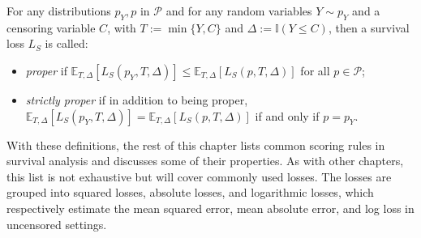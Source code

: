 \documentclass[
  letterpaper,
  krantz2]{style/krantz}
\providecommand{\tightlist}{%
  \setlength{\itemsep}{0pt}\setlength{\parskip}{0pt}}
\begin{document}
For any distributions \(p_Y, p\) in \(\mathcal{P}\) and for any random
variables \(Y \sim p_Y\) and a censoring variable \(C\), with
\(T := \min\{Y,C\}\) and \(\Delta := \mathbb{I}(Y \le C)\), then a
survival loss \(L_S\) is called:

\begin{itemize}
\tightlist
\item
  \emph{proper} if
  \(\mathbb{E}_{T, \Delta} [L_S(p_Y, T, \Delta)] \le \mathbb{E}_{T,\Delta}[L_S(p, T, \Delta)]\)
  for all \(p \in \mathcal{P}\);
\item
  \emph{strictly proper} if in addition to being proper,
  \(\mathbb{E}_{T, \Delta} [L_S(p_Y, T, \Delta)] = \mathbb{E}_{T,\Delta}[L_S(p, T, \Delta)]\)
  if and only if \(p = p_Y\).
\end{itemize}

With these definitions, the rest of this chapter lists common scoring
rules in survival analysis and discusses some of their properties. As
with other chapters, this list is not exhaustive but will cover commonly
used losses. The losses are grouped into squared losses, absolute
losses, and logarithmic losses, which respectively estimate the mean
squared error, mean absolute
error, and log loss in
uncensored settings.
\end{document}
